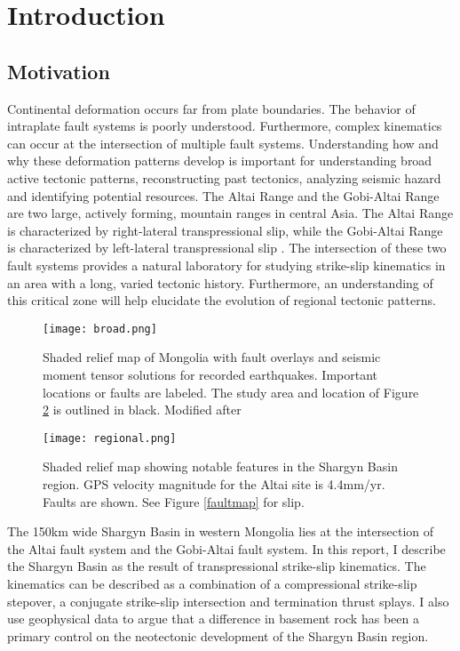 \documentclass[10pt,a4paper]{article}
\begin{document}
\doublespacing


\tableofcontents
\listoffigures
\listoftables

\section{Introduction}
\subsection{Motivation}
	Continental deformation occurs far from plate boundaries. The behavior of intraplate fault systems is poorly understood. Furthermore, complex kinematics can occur at the intersection of multiple fault systems. Understanding how and why these deformation patterns develop is important for understanding broad active tectonic patterns, reconstructing past tectonics, analyzing seismic hazard and identifying potential resources. The Altai Range and the Gobi-Altai Range are two large, actively forming, mountain ranges in central Asia. The Altai Range is characterized by right-lateral transpressional slip, while the Gobi-Altai Range is characterized by left-lateral transpressional slip \citep{Cunningham2005a}\citep{Cunningham2010}. The intersection of these two fault systems provides a natural laboratory for studying strike-slip kinematics in an area with a long, varied tectonic history. Furthermore, an understanding of this critical zone will help elucidate the evolution of regional tectonic patterns.
	
\begin{figure}[h!]
	\centering
	\texttt{[image: broad.png]}
	\caption{Shaded relief map of Mongolia with fault overlays and seismic moment tensor solutions for recorded earthquakes. Important locations or faults are labeled. The study area and location of Figure \ref{regional} is outlined in black. Modified after \citet{Calais2003}}
	\label{broad}
\end{figure}

\begin{figure}[h!]
	\centering
	\texttt{[image: regional.png]}
	\caption{Shaded relief map showing notable features in the Shargyn Basin region. GPS velocity magnitude for the Altai site is 4.4mm/yr. Faults are shown. See Figure \ref{faultmap} for slip.}
	\label{regional}
\end{figure}
	
	The 150km wide Shargyn Basin in western Mongolia lies at the intersection of the Altai fault system and the Gobi-Altai fault system. In this report, I describe the Shargyn Basin as the result of transpressional strike-slip kinematics. The kinematics can be described as a combination of a compressional strike-slip stepover, a conjugate strike-slip intersection and termination thrust splays. I also use geophysical data to argue that a difference in basement rock has been a primary control on the neotectonic development of the Shargyn Basin region.
\end{document}
